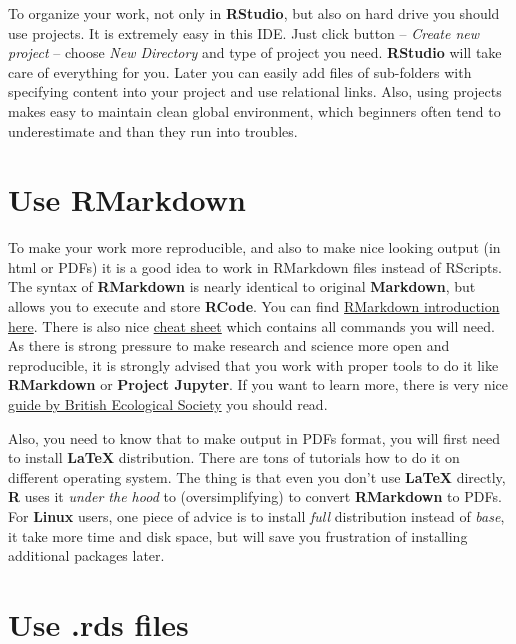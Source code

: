 \documentclass[]{book}
\theoremstyle{definition}
\theoremstyle{definition}
\theoremstyle{definition}
\theoremstyle{remark}
\begin{document}
To organize your work, not only in \textbf{RStudio}, but also on hard
drive you should use projects. It is extremely easy in this IDE. Just
click button -- \emph{Create new project} -- choose \emph{New Directory}
and type of project you need. \textbf{RStudio} will take care of
everything for you. Later you can easily add files of sub-folders with
specifying content into your project and use relational links. Also,
using projects makes easy to maintain clean global environment, which
beginners often tend to underestimate and than they run into troubles.

\section{Use RMarkdown}\label{use-rmarkdown}

To make your work more reproducible, and also to make nice looking
output (in html or PDFs) it is a good idea to work in RMarkdown files
instead of RScripts. The syntax of \textbf{RMarkdown} is nearly
identical to original \textbf{Markdown}, but allows you to execute and
store \textbf{RCode}. You can find
\href{http://rmarkdown.rstudio.com/articles_intro.html}{RMarkdown
introduction here}. There is also nice
\href{https://www.rstudio.com/wp-content/uploads/2015/02/rmarkdown-cheatsheet.pdf}{cheat
sheet} which contains all commands you will need. As there is strong
pressure to make research and science more open and reproducible, it is
strongly advised that you work with proper tools to do it like
\textbf{RMarkdown} or \textbf{Project Jupyter}. If you want to learn
more, there is very nice
\href{https://www.britishecologicalsociety.org/wp-content/uploads/2017/12/guide-to-reproducible-code.pdf}{guide
by British Ecological Society} you should read.

Also, you need to know that to make output in PDFs format, you will
first need to install \textbf{LaTeX} distribution. There are tons of
tutorials how to do it on different operating system. The thing is that
even you don't use \textbf{LaTeX} directly, \textbf{R} uses it
\emph{under the hood} to (oversimplifying) to convert \textbf{RMarkdown}
to PDFs. For \textbf{Linux} users, one piece of advice is to install
\emph{full} distribution instead of \emph{base}, it take more time and
disk space, but will save you frustration of installing additional
packages later.

\section{Use .rds files}\label{use-.rds-files}
\end{document}
